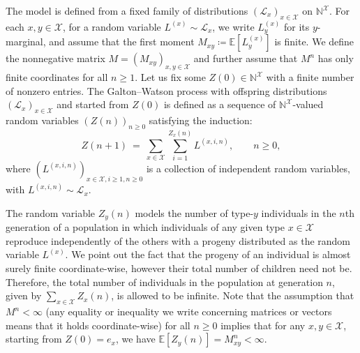 \begin{refsegment}
The model is defined from a fixed family of distributions
  $(\mathcal{L}_x)_{x\in \mathcal{X}}$ on $\mathbb{N}^{\mathcal{X}}$.
  For each $x,y \in \mathcal{X}$, for a random variable
  $L^{(x)}\sim \mathcal{L}_x$, we write $L^{(x)}_y$ for its
  $y$-marginal, and assume that the first moment
  $M_{xy}\coloneqq\mathbb{E}[L^{(x)}_y]$ is finite. We define the
  nonnegative matrix $M = (M_{xy})_{x,y\in \mathcal{X}}$ and further
  assume that $M^n$ has only finite coordinates for all $n\geq 1$. Let
  us fix some $Z(0)\in \mathbb{N}^{\mathcal{X}}$ with a finite number
  of nonzero entries. The Galton--Watson process with offspring
  distributions $(\mathcal{L}_x)_{x\in \mathcal{X}}$ and started from
  $Z(0)$ is defined as a sequence of $\mathbb{N}^{\mathcal{X}}$-valued
  random variables $(Z(n))_{n\geq 0}$ satisfying the induction:
  \[
    Z(n+1)\ =\ \sum_{x\in \mathcal{X}} \sum_{i=1}^{Z_x(n)} L^{(x,i,n)},
    \qquad n\geq 0,
  \]
  where $(L^{(x,i,n)})_{x\in \mathcal{X}, i\geq 1, n\geq 0}$ is a
  collection of independent random variables, with
  $L^{(x,i,n)}\sim \mathcal{L}_x$.

The random variable $Z_y(n)$ models the number of type-$y$
  individuals in the $n$th generation of a population in which
  individuals of any given type $x\in \mathcal{X}$ reproduce
  independently of the others with a progeny distributed as the random
  variable $L^{(x)}$. We point out the fact that the progeny of an
individual is almost surely finite coordinate-wise, however their
total number of children need not be. Therefore, the total number of
individuals in the population at generation $n$, given by
$\sum_{x\in\mathcal{X}}Z_x(n)$, is allowed to be infinite. Note
  that the assumption that $M^n < \infty$ (any equality or inequality
  we write concerning matrices or vectors means that it holds
  coordinate-wise) for all $n\geq 0$ implies that for any
  $x,y\in \mathcal{X}$, starting from $Z(0)=e_x$, we have
  $\mathbb{E}[Z_y(n)]=M^n_{xy} < \infty$.


\end{refsegment}
